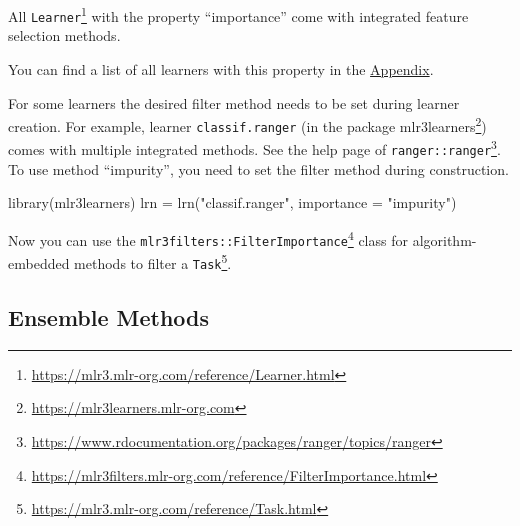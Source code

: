 \documentclass[12pt,]{scrbook}
\newenvironment{Shaded}{}{}
\newcommand{\DataTypeTok}[1]{#1}
\newcommand{\DecValTok}[1]{#1}
\newcommand{\KeywordTok}[1]{\textcolor[rgb]{0.00,0.00,1.00}{#1}}
\newcommand{\NormalTok}[1]{#1}
\newcommand{\OperatorTok}[1]{#1}
\newcommand{\StringTok}[1]{\textcolor[rgb]{0.00,0.50,0.50}{#1}}
\renewcommand{\href}[2]{#2\footnote{\url{#1}}}
\begin{document}
All \href{https://mlr3.mlr-org.com/reference/Learner.html}{\texttt{Learner}} with the property ``importance'' come with integrated feature selection methods.

You can find a list of all learners with this property in the \protect\hyperlink{fs-filter-embedded-list}{Appendix}.

For some learners the desired filter method needs to be set during learner creation.
For example, learner \texttt{classif.ranger} (in the package \href{https://mlr3learners.mlr-org.com}{mlr3learners}) comes with multiple integrated methods.
See the help page of \href{https://www.rdocumentation.org/packages/ranger/topics/ranger}{\texttt{ranger::ranger}}.
To use method ``impurity'', you need to set the filter method during construction.

\begin{Shaded}
\begin{Highlighting}[]
\KeywordTok{library}\NormalTok{(mlr3learners)}
\NormalTok{lrn =}\StringTok{ }\KeywordTok{lrn}\NormalTok{(}\StringTok{"classif.ranger"}\NormalTok{, }\DataTypeTok{importance =} \StringTok{"impurity"}\NormalTok{)}
\end{Highlighting}
\end{Shaded}

Now you can use the \href{https://mlr3filters.mlr-org.com/reference/FilterImportance.html}{\texttt{mlr3filters::FilterImportance}} class for algorithm-embedded methods to filter a \href{https://mlr3.mlr-org.com/reference/Task.html}{\texttt{Task}}.

\begin{Shaded}
\end{Shaded}

\hypertarget{fs-ensemble}{%
\subsection{Ensemble Methods}\label{fs-ensemble}}
\end{document}
